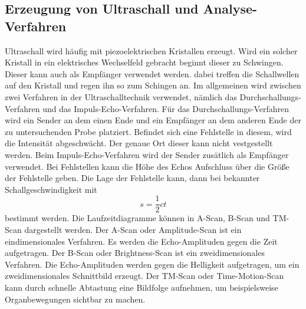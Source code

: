 \subsection{Erzeugung von Ultraschall und Analyse-Verfahren}
Ultraschall wird häufig mit piezoelektrischen Kristallen erzeugt.
Wird ein solcher Kristall in ein elektrisches Wechselfeld gebracht beginnt dieser zu Schwingen.
Dieser kann auch als Empfänger verwendet werden. dabei treffen die Schallwellen auf den Kristall und regen ihn so zum Schingen an.
Im allgemeinen wird zwischen zwei Verfahren in der Ultraschalltechnik verwendet, nämlich das Durchschallungs-Verfahren und das Impuls-Echo-Verfahren.
Für das Durchschallungs-Verfahren wird ein Sender an dem einen Ende und ein Empfänger an dem anderen Ende der zu untersuchenden Probe platziert.
Befindet sich eine Fehlstelle in diesem, wird die Intensität abgeschwächt.
Der genaue Ort dieser kann nicht vestgestellt werden.
Beim Impuls-Echo-Verfahren wird der Sender zusätlich als Empfänger verwendet.
Bei Fehlstellen kann die Höhe des Echos Aufschluss über die Größe der Fehlstelle geben.
Die Lage der Fehlstelle kann, dann bei bekannter Schallgeschwindigkeit mit
\begin{equation}
  s= \frac{1}{2}ct
\end{equation}
bestimmt werden.
Die Laufzeitdiagramme können in A-Scan, B-Scan und TM-Scan dargestellt werden.
Der A-Scan oder Amplitude-Scan ist ein eindimensionales Verfahren.
Es werden die Echo-Amplituden gegen die Zeit aufgetragen.
Der B-Scan oder Brightness-Scan ist ein zweidimensionales Verfahren.
Die Echo-Amplituden werden gegen die Helligkeit aufgetragen, um ein zweidimensionales Schnittbild erzeugt.
Der TM-Scan oder Time-Motion-Scan kann durch schnelle Abtastung eine Bildfolge aufnehmen, um beispielsweise Organbewegungen sichtbar zu machen.
